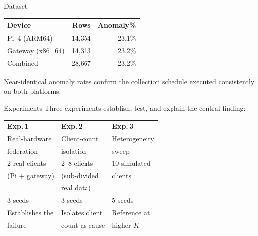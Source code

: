 \documentclass[final]{beamer}
\newlength{\colwidth}
\begin{document}
\begin{frame}[t]
\begin{columns}[t]
\begin{column}{\colwidth}
\begin{block}{Dataset}
    \vspace{0.3em}
    \begin{table}
      \centering\small
      \begin{tabular}{l r r}
        \toprule
        \textbf{Device} & \textbf{Rows} & \textbf{Anomaly\%} \\
        \midrule
        Pi~4 (ARM64)      & 14,354 & 23.1\% \\
        Gateway (x86\_64) & 14,313 & 23.2\% \\
        \midrule
        Combined          & 28,667 & 23.2\% \\
        \bottomrule
      \end{tabular}
    \end{table}
    {\footnotesize Near-identical anomaly rates confirm the collection
    schedule executed consistently on both platforms.}
  \end{block}

  \begin{block}{Experiments}
    \small
    Three experiments establish, test, and explain the central finding:

    \vspace{0.3em}
    \begin{table}
      \centering\small
      \begin{tabular}{p{0.28\colwidth} p{0.28\colwidth} p{0.28\colwidth}}
        \toprule
        \textbf{Exp.\,1} & \textbf{Exp.\,2} & \textbf{Exp.\,3} \\
        Real-hardware & Client-count & Heterogeneity \\
        federation & isolation & sweep \\
        \midrule
        2 real clients & 2--8 clients & 10 simulated \\
        (Pi + gateway) & (sub-divided & clients \\
                       & real data) & \\
        3 seeds & 3 seeds & 5 seeds \\
        Establishes the & Isolates client & Reference at \\
        failure & count as cause & higher $K$ \\
        \bottomrule
      \end{tabular}
    \end{table}
  \end{block}


\end{column}
\end{columns}
\end{frame}
\end{document}
